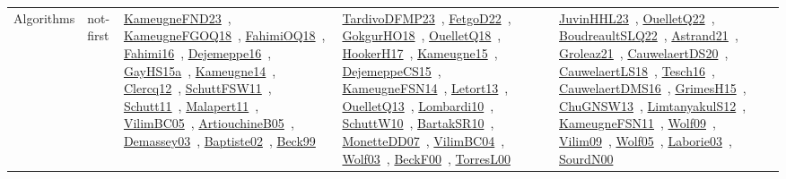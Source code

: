 {\begin{longtable}{lp{3cm}>{\raggedright\arraybackslash}p{6cm}>{\raggedright\arraybackslash}p{6cm}>{\raggedright\arraybackslash}p{8cm}}
Algorithms & not-first & \href{works/KameugneFND23.pdf}{KameugneFND23}~\cite{KameugneFND23}, \href{works/KameugneFGOQ18.pdf}{KameugneFGOQ18}~\cite{KameugneFGOQ18}, \href{works/FahimiOQ18.pdf}{FahimiOQ18}~\cite{FahimiOQ18}, \href{works/Fahimi16.pdf}{Fahimi16}~\cite{Fahimi16}, \href{works/Dejemeppe16.pdf}{Dejemeppe16}~\cite{Dejemeppe16}, \href{works/GayHS15a.pdf}{GayHS15a}~\cite{GayHS15a}, \href{works/Kameugne14.pdf}{Kameugne14}~\cite{Kameugne14}, \href{works/Clercq12.pdf}{Clercq12}~\cite{Clercq12}, \href{works/SchuttFSW11.pdf}{SchuttFSW11}~\cite{SchuttFSW11}, \href{works/Schutt11.pdf}{Schutt11}~\cite{Schutt11}, \href{works/Malapert11.pdf}{Malapert11}~\cite{Malapert11}, \href{works/VilimBC05.pdf}{VilimBC05}~\cite{VilimBC05}, \href{works/ArtiouchineB05.pdf}{ArtiouchineB05}~\cite{ArtiouchineB05}, \href{works/Demassey03.pdf}{Demassey03}~\cite{Demassey03}, \href{works/Baptiste02.pdf}{Baptiste02}~\cite{Baptiste02}, \href{works/Beck99.pdf}{Beck99}~\cite{Beck99} & \href{works/TardivoDFMP23.pdf}{TardivoDFMP23}~\cite{TardivoDFMP23}, \href{works/FetgoD22.pdf}{FetgoD22}~\cite{FetgoD22}, \href{works/GokgurHO18.pdf}{GokgurHO18}~\cite{GokgurHO18}, \href{works/OuelletQ18.pdf}{OuelletQ18}~\cite{OuelletQ18}, \href{works/HookerH17.pdf}{HookerH17}~\cite{HookerH17}, \href{works/Kameugne15.pdf}{Kameugne15}~\cite{Kameugne15}, \href{works/DejemeppeCS15.pdf}{DejemeppeCS15}~\cite{DejemeppeCS15}, \href{works/KameugneFSN14.pdf}{KameugneFSN14}~\cite{KameugneFSN14}, \href{works/Letort13.pdf}{Letort13}~\cite{Letort13}, \href{works/OuelletQ13.pdf}{OuelletQ13}~\cite{OuelletQ13}, \href{works/Lombardi10.pdf}{Lombardi10}~\cite{Lombardi10}, \href{works/SchuttW10.pdf}{SchuttW10}~\cite{SchuttW10}, \href{works/BartakSR10.pdf}{BartakSR10}~\cite{BartakSR10}, \href{works/MonetteDD07.pdf}{MonetteDD07}~\cite{MonetteDD07}, \href{works/VilimBC04.pdf}{VilimBC04}~\cite{VilimBC04}, \href{works/Wolf03.pdf}{Wolf03}~\cite{Wolf03}, \href{works/BeckF00.pdf}{BeckF00}~\cite{BeckF00}, \href{works/TorresL00.pdf}{TorresL00}~\cite{TorresL00} & \href{works/JuvinHHL23.pdf}{JuvinHHL23}~\cite{JuvinHHL23}, \href{works/OuelletQ22.pdf}{OuelletQ22}~\cite{OuelletQ22}, \href{works/BoudreaultSLQ22.pdf}{BoudreaultSLQ22}~\cite{BoudreaultSLQ22}, \href{works/Astrand21.pdf}{Astrand21}~\cite{Astrand21}, \href{works/Groleaz21.pdf}{Groleaz21}~\cite{Groleaz21}, \href{works/CauwelaertDS20.pdf}{CauwelaertDS20}~\cite{CauwelaertDS20}, \href{works/CauwelaertLS18.pdf}{CauwelaertLS18}~\cite{CauwelaertLS18}, \href{works/Tesch16.pdf}{Tesch16}~\cite{Tesch16}, \href{works/CauwelaertDMS16.pdf}{CauwelaertDMS16}~\cite{CauwelaertDMS16}, \href{works/GrimesH15.pdf}{GrimesH15}~\cite{GrimesH15}, \href{works/ChuGNSW13.pdf}{ChuGNSW13}~\cite{ChuGNSW13}, \href{works/LimtanyakulS12.pdf}{LimtanyakulS12}~\cite{LimtanyakulS12}, \href{works/KameugneFSN11.pdf}{KameugneFSN11}~\cite{KameugneFSN11}, \href{works/Wolf09.pdf}{Wolf09}~\cite{Wolf09}, \href{works/Vilim09.pdf}{Vilim09}~\cite{Vilim09}, \href{works/Wolf05.pdf}{Wolf05}~\cite{Wolf05}, \href{works/Laborie03.pdf}{Laborie03}~\cite{Laborie03}, \href{works/SourdN00.pdf}{SourdN00}~\cite{SourdN00}\\

\end{longtable}}
